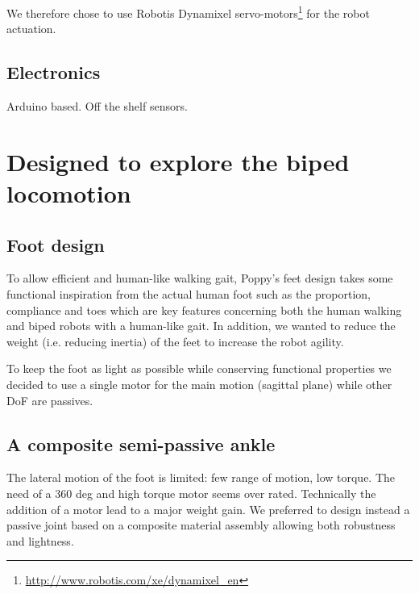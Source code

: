 We therefore chose to use Robotis Dynamixel servo-motors\footnote{\url{http://www.robotis.com/xe/dynamixel_en}} for the robot actuation.


\subsection{Electronics} %
Arduino based. Off the shelf sensors.






\section{Designed to explore the biped locomotion}

\subsection{Foot design} %
To allow efficient and human-like walking gait, Poppy's feet design takes some functional inspiration from the actual human foot such as the proportion, compliance and toes which are key features concerning both the human walking and biped robots with a human-like gait. In addition, we wanted to reduce the weight (i.e. reducing inertia) of the feet to increase the robot agility.

To keep the foot as light as possible while conserving functional properties we decided to use a single motor for the main motion (sagittal plane) while other DoF are passives.

\subsection{A composite semi-passive ankle} %
The lateral motion of the foot is limited: few range of motion, low torque. The need of a 360 deg and high torque motor seems over rated. Technically the addition of a motor lead to a major weight gain. We preferred to design  instead a passive joint based on a composite material assembly allowing both robustness and lightness.


